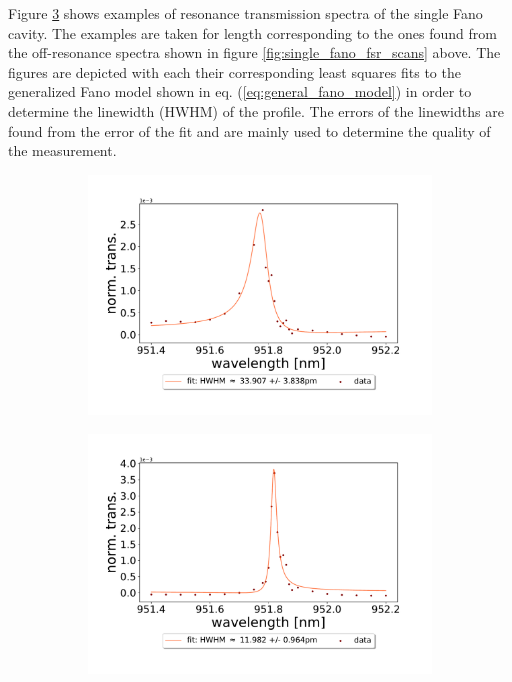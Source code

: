 Figure \ref{fig:M5/G1_single_fano_trans_examples} shows examples of resonance transmission spectra of the single Fano cavity. The examples are taken for length corresponding to the ones found from the off-resonance spectra shown in figure \ref{fig:single_fano_fsr_scans} above. The figures are depicted with each their corresponding least squares fits to the generalized Fano model shown in eq. (\ref{eq:general_fano_model}) in order to determine the linewidth (HWHM) of the profile. The errors of the linewidths are found from the error of the fit and are mainly used to determine the quality of the measurement. 

\begin{figure}[h!]
    \centering
    \begin{subfigure}[b]{0.49\textwidth}
        \centering
        \includegraphics[width=\textwidth]{figures/results/single fano fits/60um_M5_fit_1.pdf}
        \caption{}
        \label{fig:short_single_fano_trans}
    \end{subfigure}
    \begin{subfigure}[b]{0.49\textwidth}
        \centering
        \includegraphics[width=\textwidth]{figures/results/single fano fits/220um_M5_fit_4.pdf}
        \caption{}
        \label{fig:long_single_fano_trans}
    \end{subfigure}
    \caption{}
    \label{fig:M5/G1_single_fano_trans_examples}
\end{figure}

